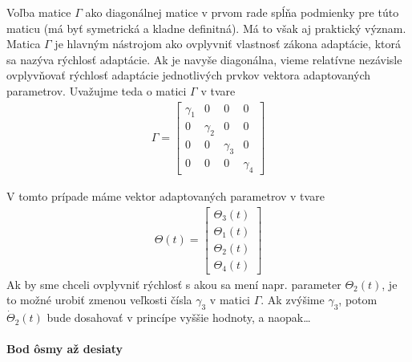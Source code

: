 \documentclass[a4paper, 10pt, ]{article}
\begin{document}
\smallskip

\noindent
Voľba matice $\Gamma$ ako diagonálnej matice v prvom rade spĺňa podmienky pre túto maticu (má byť symetrická a kladne definitná). Má to však aj praktický význam. Matica  $\Gamma$ je hlavným nástrojom ako ovplyvniť vlastnosť zákona adaptácie, ktorá sa nazýva rýchlosť adaptácie. Ak je navyše diagonálna, vieme relatívne nezávisle ovplyvňovať rýchlosť adaptácie jednotlivých prvkov vektora adaptovaných parametrov. Uvažujme teda o matici $\Gamma$ v tvare
\begin{align}
    \Gamma =
    \begin{bmatrix}
        \gamma_1 & 0 & 0 & 0 \\
        0 & \gamma_2 & 0 & 0 \\
        0 & 0 & \gamma_3 & 0 \\
        0 & 0 & 0 & \gamma_4
    \end{bmatrix}
\end{align}

V tomto prípade máme vektor adaptovaných parametrov v tvare
\begin{align}
    \Theta(t) =
    \begin{bmatrix}
          \Theta_3(t) \\ \Theta_1(t) \\ \Theta_2(t) \\ \Theta_4(t)
    \end{bmatrix}
\end{align}
Ak by sme chceli ovplyvniť rýchlosť s akou sa mení napr. parameter $\Theta_2(t)$, je to možné urobiť zmenou veľkosti čísla $\gamma_3$ v matici $\Gamma$. Ak zvýšime $\gamma_3$, potom $\dot \Theta_2(t)$ bude dosahovať v princípe vyššie hodnoty, a naopak\ldots















\paragraph{Bod ôsmy až desiaty}

\smallskip
\end{document}
